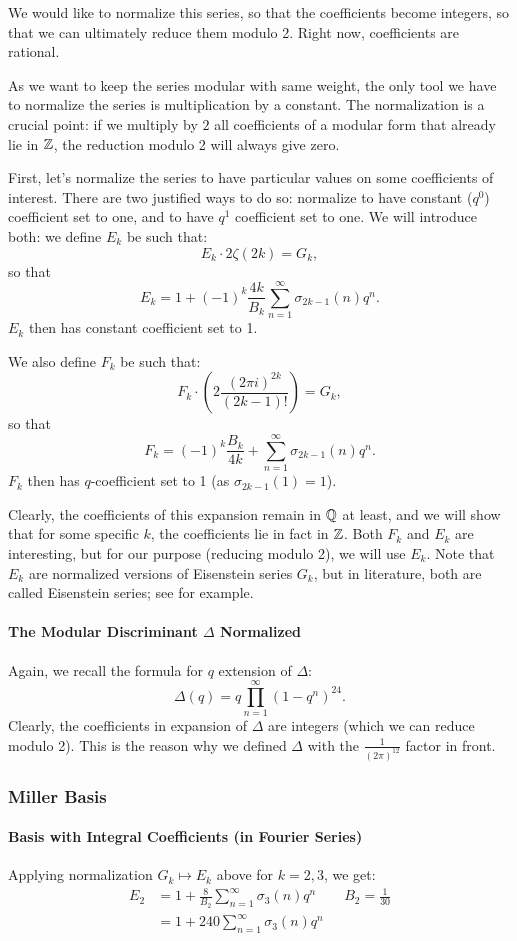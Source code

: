 We would like to normalize this series, so that the coefficients become integers, so that we can ultimately reduce them modulo 2.
Right now, coefficients are rational.

As we want to keep the series modular with same weight, the only tool we have to normalize the series is multiplication by a constant.
The normalization is a crucial point: if we multiply by $2$ all coefficients of a modular form that already lie in $\mathbb{Z}$, the reduction modulo 2 will always give zero.

First, let's normalize the series to have particular values on some coefficients of interest.
There are two justified ways to do so: normalize to have constant ($q^0$) coefficient set to one, and to have $q^1$ coefficient set to one.
We will introduce both:
we define $E_k$ be such that:
$$
E_k \cdot 2\zeta(2k) = G_k,
$$
so that
$$
E_k = 1 + (-1)^k \frac{4k}{B_k} \sum_{n=1}^{\infty} \sigma_{2k-1}(n)q^n.
$$
$E_k$ then has constant coefficient set to 1.

We also define $F_k$ be such that:
$$
F_k \cdot \left( 2 \frac{{(2 \pi i)}^{2k}}{(2k-1)!} \right) = G_k,
$$
so that
$$
F_k =  (-1)^k \frac{B_k}{4k} + \sum_{n=1}^{\infty} \sigma_{2k-1}(n)q^n.
$$
$F_k$ then has $q$-coefficient set to 1 (as $\sigma_{2k-1}(1)=1$).

Clearly, the coefficients of this expansion remain in $\mathbb{Q}$ at least, and we will show that for some specific $k$, the coefficients lie in fact in $\mathbb{Z}$.
Both $F_k$ and $E_k$ are interesting, but for our purpose (reducing modulo 2), we will use $E_k$.
Note that $E_k$ are normalized versions of Eisenstein series $G_k$, but in literature, both are called Eisenstein series; see \cite[p.6]{IntoductionModularFormsWorkshop} for example.

\paragraph{The Modular Discriminant $\Delta$ Normalized}
Again, we recall the formula for $q$ extension of $\Delta$:
$$
\Delta(q) = q \prod_{n=1}^{\infty} (1-q^n)^{24}.
$$
Clearly, the coefficients in expansion of $\Delta$ are integers (which we can reduce modulo 2).
This is the reason why we defined $\Delta$ with the $\frac{1}{(2\pi)^{12}}$ factor in front.


\subsubsection{Miller Basis}
\paragraph{Basis with Integral Coefficients (in Fourier Series)}
Applying normalization $G_k \mapsto E_k$ above for $k=2,3$, we get:
\begin{align*}
	E_2 &= 1 + \frac{8}{B_2} \sum_{n=1}^{\infty} \sigma_{3}(n)q^n \qquad B_2 = \frac{1}{30} \\
	    &= 1 + 240 \sum_{n=1}^{\infty} \sigma_{3}(n)q^n
\end{align*}

